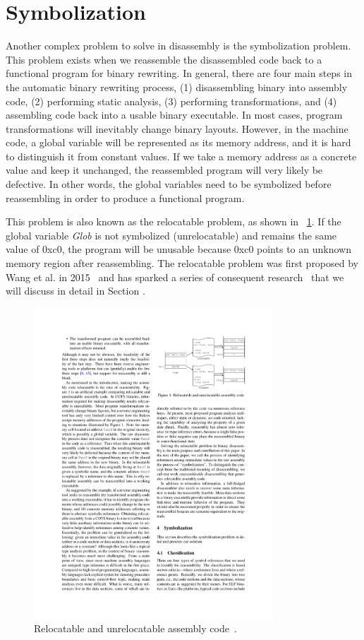 \section{Symbolization} \label{sec:challenges-symbol}
Another complex problem to solve in disassembly is the symbolization problem.
This problem exists when we reassemble the disassembled code back to a
functional program for binary rewriting. In general, there are four main steps
in the automatic binary rewriting process, (1) disassembling binary into
assembly code, (2) performing static analysis, (3) performing transformations,
and (4) assembling code back into a usable binary executable.
In most cases, program transformations will inevitably change binary layouts.
However, in the machine code, a global variable will be represented as its
memory address, and it is hard to distinguish it from constant values. If we
take a memory address as a concrete value and keep it unchanged, the
reassembled program will very likely be defective. In other words, the global
variables need to be symbolized before reassembling in order to produce a
functional program.

This problem is also known as the relocatable problem, as shown in
\F~\ref{fig:relocatable}. If the global variable \textit{Glob} is not
symbolized (unrelocatable) and remains the same value of 0xc0, the program will
be unusable because 0xc0 points to an unknown memory region after reassembling.
The relocatable problem was first proposed by Wang et al. in
2015~\cite{wang2015reassembleable} and has sparked a series of consequent
research~\cite{wang2017ramblr,williams2020egalito,dinesh2020retrowrite} that we
will discuss in detail in Section .

\begin{figure}[tb]
  \centering
  \includegraphics[width=0.8\textwidth]{fig/relocatable.pdf}
  \caption{Relocatable and unrelocatable assembly code~\cite{wang2015reassembleable}.}
  \label{fig:relocatable}
\end{figure}

